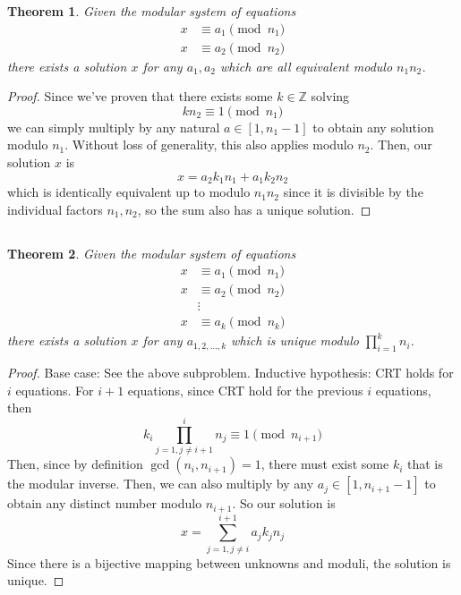 \documentclass{article}
\newtheorem{theorem}{Theorem}
\newcommand{\Z}{\mathbb{Z}}
\begin{document}
\begin{theorem}
    Given the modular system of equations
    \begin{align}
        x &\equiv a_1 \pmod{n_1} \\
        x &\equiv a_2 \pmod{n_2}
    \end{align}
    there exists a solution \(x\) for any \(a_1, a_2\) which are all equivalent modulo \(n_1 n_2\).
\end{theorem}
\begin{proof}
    Since we've proven that there exists some \(k \in \Z\) solving
    \begin{equation}
        k n_2 \equiv 1 \pmod{n_1}
    \end{equation}
    we can simply multiply by any natural \(a \in [1, n_1 - 1]\) to obtain any solution modulo \(n_1\).
    Without loss of generality, this also applies modulo \(n_2\).
    Then, our solution \(x\) is
    \begin{equation}
        x = a_2 k_1 n_1 + a_1 k_2 n_2
    \end{equation}
    which is identically equivalent up to modulo \(n_1 n_2\) since it is divisible by the individual factors \(n_1, n_2\), so the sum also has a unique solution.
\end{proof}

\subsection{}

\begin{theorem}
    Given the modular system of equations
    \begin{align}
        x &\equiv a_1 \pmod{n_1} \\
        x &\equiv a_2 \pmod{n_2} \\
        &\vdots \\
        x &\equiv a_k \pmod{n_k}
    \end{align}
    there exists a solution \(x\) for any \(a_{1, 2, \ldots, k}\) which is unique modulo \(\prod_{i = 1}^k n_i\).
\end{theorem}
\begin{proof}
    Base case: See the above subproblem.
    Inductive hypothesis: CRT holds for \(i\) equations.
    For \(i + 1\) equations, since CRT hold for the previous \(i\) equations, then
    \begin{equation}
        k_i \prod_{j = 1, j \neq i + 1}^i n_j \equiv 1 \pmod{n_{i + 1}}
    \end{equation}
    Then, since by definition \(\gcd(n_i, n_{i + 1}) = 1\), there must exist some \(k_i\) that is the modular inverse.
    Then, we can also multiply by any \(a_j \in [1, n_{i + 1} - 1]\) to obtain any distinct number modulo \(n_{i + 1}\).
    So our solution is
    \begin{equation}
        x = \sum_{j = 1, j \neq i}^{i + 1} a_j k_j n_j
    \end{equation}
    Since there is a bijective mapping between unknowns and moduli, the solution is unique.
\end{proof}
\end{document}
